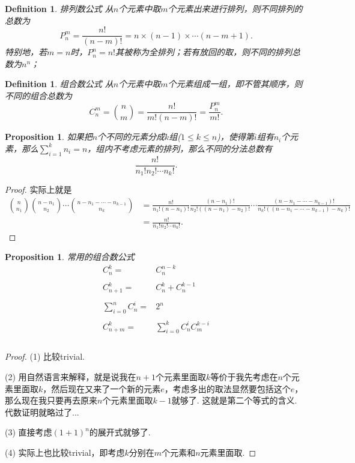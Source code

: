 \documentclass{article}
\newtheorem{proposition}[theorem]{Proposition}
\newtheorem{definition}[theorem]{Definition}
\begin{document}
\begin{definition}
\rm {\color{red} 排列数公式} 从$n$个元素中取$m$个元素出来进行排列，则不同排列的总数为
$$
P^m_n = \frac{n!}{(n-m)!} = n\times(n-1)\times\cdots(n-m+1).
$$
特别地，若$m=n$时，$P^n_n = n!$其被称为{\color{red}全排列}；若有放回的取，则不同的排列总数为$n^n$；
\end{definition}

\begin{definition}
\rm {\color{red} 组合数公式} 从$n$个元素中取$m$个元素组成一组，即不管其顺序，则不同的组合总数为
$$
C^m_n = \binom nm  = \frac{n!}{m!(n-m)!} = \frac{P^m_n}{m!}. 
$$
\end{definition}

\begin{proposition}
\rm 如果把$n$个不同的元素分成$k$组($1\leq k \leq n$)，使得第$i$组有$n_i$个元素，那么$\sum\limits_{i=1}^k n_i = n$，组内不考虑元素的排列，那么不同的分法总数有
$$
\frac{n!}{n_1!n_2!\cdots n_k!}.
$$
\end{proposition}

\begin{proof}
实际上就是
$$
\begin{array}{ll}
\binom {n}{n_1} \binom{n-n_1}{n_2} \cdots \binom{n-n_1-\cdots-n_{k-1}}{n_k} &= \frac{n!}{n_1!(n-n_1)!} \frac{(n-n_1)!}{n_2!((n-n_1)-n_2)!}\cdots \frac{(n-n_1-\cdots-n_{k-1})!}{n_k!((n-n_1-\cdots-n_{k-1})-n_{k})!} \\
&= \frac{n!}{n_1!n_2!\cdots n_k!}.
\end{array}
$$
\end{proof}

\begin{proposition}
\rm {\color{red} 常用的组合数公式}
$$
\begin{array}{rl}
C^k_n =& C^{n-k}_n \\ \\
C^k_{n+1} =& C^k_n + C^{k-1}_n \\ \\
\sum\limits_{i=0}^n C^i_n =& 2^n \\ \\
C^k_{n+m} =& \sum\limits_{i=0}^k C^i_n C^{k-i}_m \\ \\
\end{array}
$$
\end{proposition}

\begin{proof}
(1) 比较trivial.

(2) 用自然语言来解释，就是说我在$n+1$个元素里面取$k$等价于我先考虑在$n$个元素里面取$k$，然后现在又来了一个新的元素$e$，考虑多出的取法显然要包括这个$e$，那么现在我只要再去原来$n$个元素里面取$k-1$就够了. 这就是第二个等式的含义. 代数证明就略过了...

(3) 直接考虑$(1+1)^n$的展开式就够了.

(4) 实际上也比较trivial，即考虑$k$分别在$m$个元素和$n$元素里面取.
\end{proof}
\end{document}
